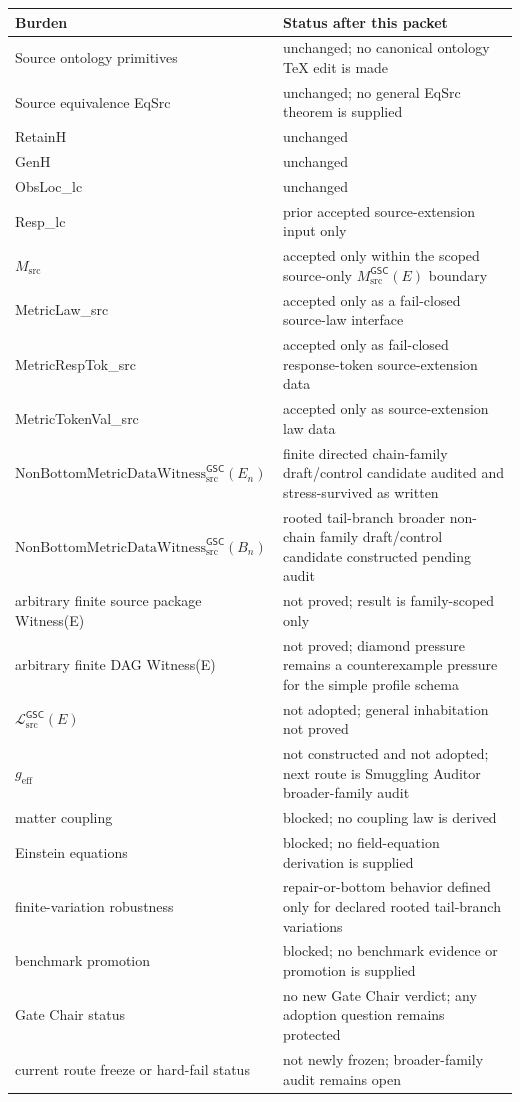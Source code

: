 \documentclass[11pt]{article}
\newcommand{\Witness}{\mathrm{NonBottomMetricDataWitness}_{\mathrm{src}}^{\mathsf{GSC}}}
\newcommand{\MetricData}{\mathcal{L}_{\mathrm{src}}^{\mathsf{GSC}}}
\newcommand{\geff}{g_{\mathrm{eff}}}
\newcommand{\En}{E_n}
\newcommand{\Bn}{B_n}
\begin{document}
\begin{longtable}{p{}p{}}
\toprule
Burden & Status after this packet \\
\midrule
Source ontology primitives & unchanged; no canonical ontology TeX edit is made \\
Source equivalence EqSrc & unchanged; no general EqSrc theorem is supplied \\
RetainH & unchanged \\
GenH & unchanged \\
ObsLoc\_lc & unchanged \\
Resp\_lc & prior accepted source-extension input only \\
\(M_{\mathrm{src}}\) & accepted only within the scoped source-only \(M_{\mathrm{src}}^{\mathsf{GSC}}(E)\) boundary \\
MetricLaw\_src & accepted only as a fail-closed source-law interface \\
MetricRespTok\_src & accepted only as fail-closed response-token source-extension data \\
MetricTokenVal\_src & accepted only as source-extension law data \\
\(\Witness(\En)\) & finite directed chain-family draft/control candidate audited and stress-survived as written \\
\(\Witness(\Bn)\) & rooted tail-branch broader non-chain family draft/control candidate constructed pending audit \\
arbitrary finite source package Witness(E) & not proved; result is family-scoped only \\
arbitrary finite DAG Witness(E) & not proved; diamond pressure remains a counterexample pressure for the simple profile schema \\
\(\MetricData(E)\) & not adopted; general inhabitation not proved \\
\(\geff\) & not constructed and not adopted; next route is Smuggling Auditor broader-family audit \\
matter coupling & blocked; no coupling law is derived \\
Einstein equations & blocked; no field-equation derivation is supplied \\
finite-variation robustness & repair-or-bottom behavior defined only for declared rooted tail-branch variations \\
benchmark promotion & blocked; no benchmark evidence or promotion is supplied \\
Gate Chair status & no new Gate Chair verdict; any adoption question remains protected \\
current route freeze or hard-fail status & not newly frozen; broader-family audit remains open \\
\bottomrule
\end{longtable}
\end{document}
